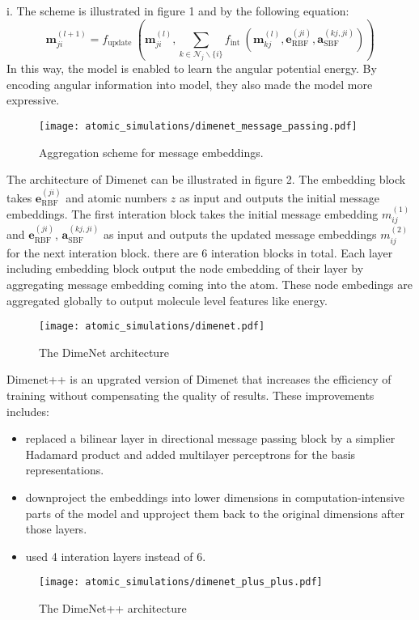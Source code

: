 i. The scheme is illustrated in figure 1 and by the following equation:
\begin{equation}
    \boldsymbol{m}_{j i}^{(l+1)}=f_{\text {update }}\left(\boldsymbol{m}_{j i}^{(l)}, \sum_{k \in \mathcal{N}_{j} \backslash\{i\}} f_{\text {int }}\left(\boldsymbol{m}_{k j}^{(l)}, \boldsymbol{e}_{\mathrm{RBF}}^{(j i)}, \boldsymbol{a}_{\mathrm{SBF}}^{(k j, j i)}\right)\right)
\end{equation}
In this way, the model is enabled to learn the angular potential energy. By encoding angular information 
into model, they also made the model more expressive.\\
\begin{figure}[H]
    \centering
    \texttt{[image: atomic\_simulations/dimenet\_message\_passing.pdf]}
    \caption{Aggregation
    scheme for message
    embeddings. \cite*{DBLP:journals/corr/abs-2003-03123}}
  \end{figure}
The architecture of Dimenet can be illustrated in figure 2. 
The embedding block takes $\boldsymbol{e}_{\mathrm{RBF}}^{(j i)}$ and 
atomic numbers $z$ as input and outputs the initial message embeddings. 
The first interation block takes the initial message embedding $m_{ij}^{(1)}$ 
and $\boldsymbol{e}_{\mathrm{RBF}}^{(j i)}$, $\boldsymbol{a}_{\mathrm{SBF}}^{(k j, j i)}$ 
as input and outputs the updated message embeddings $m_{ij}^{(2)}$ for the next interation 
block. there are 6 interation blocks in total. Each layer including embedding block output 
the node embedding of their layer by aggregating message embedding coming into the atom. 
These node embedings are aggregated globally to output molecule level features like energy.\\
\begin{figure}[H]
    \centering
    \texttt{[image: atomic\_simulations/dimenet.pdf]}
    \caption{The DimeNet architecture \cite*{DBLP:journals/corr/abs-2003-03123}}
  \end{figure}
Dimenet++ is an upgrated version of Dimenet that increases the efficiency of training 
without compensating the quality of results. These improvements includes: \\
\begin{itemize}
    \item replaced a bilinear layer in directional message passing block by a 
    simplier Hadamard product and added multilayer perceptrons for the basis representations.
    \item downproject the embeddings into lower dimensions in computation-intensive 
    parts of the model and upproject them back to the original dimensions after those layers.
    \item used 4 interation layers instead of 6. 
\end{itemize}

\begin{figure}[H]
  \centering
\texttt{[image: atomic\_simulations/dimenet\_plus\_plus.pdf]}
\caption{The DimeNet++ architecture \cite*{https://doi.org/10.48550/arxiv.2203.09697}}
\label{fig:one}
\end{figure}